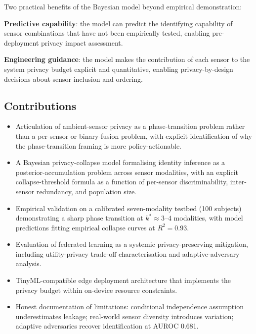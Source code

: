 \documentclass[sigconf,nonacm]{acmart}
\begin{document}
Two practical benefits of the Bayesian model beyond empirical
demonstration:

\textbf{Predictive capability}: the model can predict the
identifying capability of sensor combinations that have not been
empirically tested, enabling pre-deployment privacy impact
assessment.

\textbf{Engineering guidance}: the model makes the contribution
of each sensor to the system privacy budget explicit and
quantitative, enabling privacy-by-design decisions about sensor
inclusion and ordering.

\subsection{Contributions}

\begin{itemize}
  \item Articulation of ambient-sensor privacy as a
        phase-transition problem rather than a per-sensor or
        binary-fusion problem, with explicit identification of why
        the phase-transition framing is more policy-actionable.
  \item A Bayesian privacy-collapse model formalising identity
        inference as a posterior-accumulation problem across sensor
        modalities, with an explicit collapse-threshold formula
        as a function of per-sensor discriminability, inter-sensor
        redundancy, and population size.
  \item Empirical validation on a calibrated seven-modality
        testbed (100 subjects) demonstrating a sharp phase
        transition at $k^* \approx 3$--$4$ modalities, with model
        predictions fitting empirical collapse curves at $R^2 =
        0.93$.
  \item Evaluation of federated learning as a systemic
        privacy-preserving mitigation, including utility-privacy
        trade-off characterisation and adaptive-adversary
        analysis.
  \item TinyML-compatible edge deployment architecture that
        implements the privacy budget within on-device resource
        constraints.
  \item Honest documentation of limitations: conditional
        independence assumption underestimates leakage;
        real-world sensor diversity introduces variation; adaptive
        adversaries recover identification at AUROC 0.681.
\end{itemize}
\end{document}
